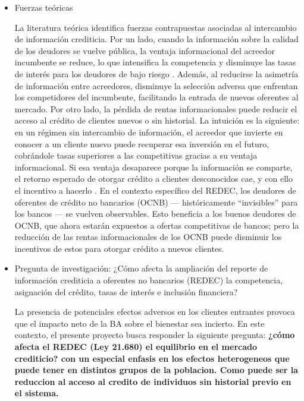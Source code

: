 \documentclass[11pt]{article}
\theoremstyle{plain}
\theoremstyle{plain}
\begin{document}
\begin{itemize}
    \item Fuerzas teóricas %

La literatura teórica identifica fuerzas contrapuestas asociadas al intercambio de información crediticia. Por un lado, cuando la información sobre la calidad de los deudores se vuelve pública, la ventaja informacional del acreedor incumbente se reduce, lo que intensifica la competencia y disminuye las tasas de interés para los deudores de bajo riesgo \parencite{sharpe_asymmetric_1990, petersen_effect_1995}. Además, al reducirse la asimetría de información entre acreedores, disminuye la selección adversa que enfrentan los competidores del incumbente, facilitando la entrada de nuevos oferentes al mercado. Por otro lado, la pérdida de rentas informacionales puede reducir el acceso al crédito de clientes nuevos o sin historial. La intuición es la siguiente: en un régimen sin intercambio de información, el acreedor que invierte en conocer a un cliente nuevo puede recuperar esa inversión en el futuro, cobrándole tasas superiores a las competitivas gracias a su ventaja informacional. Si esa ventaja desaparece porque la información se comparte, el retorno esperado de otorgar crédito a clientes desconocidos cae, y con ello el incentivo a hacerlo \parencite{petersen_effect_1995, dellariccia_information_2004}. En el contexto específico del REDEC, los deudores de oferentes de crédito no bancarios (OCNB) --- históricamente ``invisibles'' para los bancos --- se vuelven observables. Esto beneficia a los buenos deudores de OCNB, que ahora estarán expuestos a ofertas competitivas de bancos; pero la reducción de las rentas informacionales de los OCNB puede disminuir los incentivos de estos para otorgar crédito a nuevos clientes.


    \item Pregunta de investigación: ¿Cómo afecta la ampliación del reporte de información crediticia a oferentes no bancarios (REDEC) la competencia, asignación del crédito, tasas de interés e inclusión financiera?

La presencia de potenciales efectos adversos en los clientes entrantes provoca que el  impacto neto de la BA sobre el bienestar sea incierto. 
En este contexto, el presente proyecto busca responder la siguiente pregunta: \textbf{¿cómo afecta el REDEC (Ley 21.680) el equilibrio en el mercado crediticio? con un especial enfasis en los efectos heterogeneos que puede tener en distintos grupos de la poblacion. Como puede ser la reduccion al acceso al credito de individuos sin historial previo en el sistema. }




\end{itemize}
\end{document}
